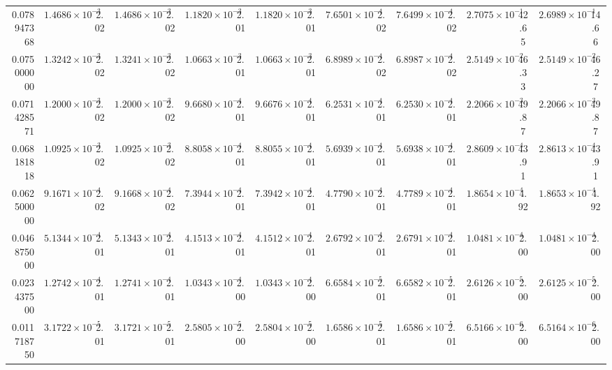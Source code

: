 \begin{table}
{\begin{tabular}{r cc cc cc cc cc cc cc cc }
0.078947368 & $1.4686\times10^{-3}$ & 2.02 & $1.4686\times10^{-3}$ & 2.02 & $1.1820\times10^{-3}$ & 2.01 & $1.1820\times10^{-3}$ & 2.01 & $7.6501\times10^{-4}$ & 2.02 & $7.6499\times10^{-4}$ & 2.02 & $2.7075\times10^{-1}$ & 42.65 & $2.6989\times10^{-1}$ & 14.66 \\
0.075000000 & $1.3242\times10^{-3}$ & 2.02 & $1.3241\times10^{-3}$ & 2.02 & $1.0663\times10^{-3}$ & 2.01 & $1.0663\times10^{-3}$ & 2.01 & $6.8989\times10^{-4}$ & 2.02 & $6.8987\times10^{-4}$ & 2.02 & $2.5149\times10^{-2}$ & 46.33 & $2.5149\times10^{-2}$ & 46.27 \\
0.071428571 & $1.2000\times10^{-3}$ & 2.02 & $1.2000\times10^{-3}$ & 2.02 & $9.6680\times10^{-4}$ & 2.01 & $9.6676\times10^{-4}$ & 2.01 & $6.2531\times10^{-4}$ & 2.01 & $6.2530\times10^{-4}$ & 2.01 & $2.2066\times10^{-3}$ & 49.87 & $2.2066\times10^{-3}$ & 49.87 \\
0.068181818 & $1.0925\times10^{-3}$ & 2.02 & $1.0925\times10^{-3}$ & 2.02 & $8.8058\times10^{-4}$ & 2.01 & $8.8055\times10^{-4}$ & 2.01 & $5.6939\times10^{-4}$ & 2.01 & $5.6938\times10^{-4}$ & 2.01 & $2.8609\times10^{-4}$ & 43.91 & $2.8613\times10^{-4}$ & 43.91 \\
0.062500000 & $9.1671\times10^{-4}$ & 2.02 & $9.1668\times10^{-4}$ & 2.02 & $7.3944\times10^{-4}$ & 2.01 & $7.3942\times10^{-4}$ & 2.01 & $4.7790\times10^{-4}$ & 2.01 & $4.7789\times10^{-4}$ & 2.01 & $1.8654\times10^{-4}$ & 4.92 & $1.8653\times10^{-4}$ & 4.92 \\
0.046875000 & $5.1344\times10^{-4}$ & 2.01 & $5.1343\times10^{-4}$ & 2.01 & $4.1513\times10^{-4}$ & 2.01 & $4.1512\times10^{-4}$ & 2.01 & $2.6792\times10^{-4}$ & 2.01 & $2.6791\times10^{-4}$ & 2.01 & $1.0481\times10^{-4}$ & 2.00 & $1.0481\times10^{-4}$ & 2.00 \\
0.023437500 & $1.2742\times10^{-4}$ & 2.01 & $1.2741\times10^{-4}$ & 2.01 & $1.0343\times10^{-4}$ & 2.00 & $1.0343\times10^{-4}$ & 2.00 & $6.6584\times10^{-5}$ & 2.01 & $6.6582\times10^{-5}$ & 2.01 & $2.6126\times10^{-5}$ & 2.00 & $2.6125\times10^{-5}$ & 2.00 \\
0.011718750 & $3.1722\times10^{-5}$ & 2.01 & $3.1721\times10^{-5}$ & 2.01 & $2.5805\times10^{-5}$ & 2.00 & $2.5804\times10^{-5}$ & 2.00 & $1.6586\times10^{-5}$ & 2.01 & $1.6586\times10^{-5}$ & 2.01 & $6.5166\times10^{-6}$ & 2.00 & $6.5164\times10^{-6}$ & 2.00 \\
\bottomrule
\end{tabular}}
\end{table}
